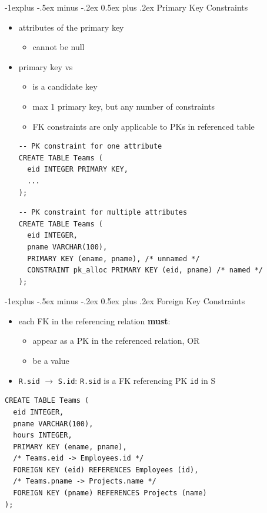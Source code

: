 \documentclass[10pt, landscape]{article}
\makeatletter
\renewcommand{\subsection}{\@startsection{subsection}{2}{0mm}%
  {-1explus -.5ex minus -.2ex}%
  {0.5ex plus .2ex}%
{\normalfont\normalsize\bfseries}}
\makeatother
\begin{document}
\begin{multicols}{3}
  \subsection{Primary Key Constraints}
  \begin{itemize}
    \item {} attributes of the primary key 
      \begin{itemize}
        \item cannot be null
      \end{itemize}
    \item primary key vs 
      \begin{itemize}
        \item {} is a candidate key
        \item max 1 primary key, but any number of  constraints
        \item FK constraints are only applicable to PKs in referenced table
      \end{itemize}
      \begin{lstlisting}[style=mySQL]
-- PK constraint for one attribute
CREATE TABLE Teams (
  eid INTEGER PRIMARY KEY, 
  ... 
);
      \end{lstlisting}
      \begin{lstlisting}[style=mySQL]
-- PK constraint for multiple attributes
CREATE TABLE Teams (
  eid INTEGER,
  pname VARCHAR(100),
  PRIMARY KEY (ename, pname), /* unnamed */
  CONSTRAINT pk_alloc PRIMARY KEY (eid, pname) /* named */
);
      \end{lstlisting}
  \end{itemize}

  \subsection{Foreign Key Constraints}
  \begin{itemize}
    \item each FK in the referencing relation \textbf{must}:
      \begin{itemize}
        \item appear as a PK in the referenced relation, OR
        \item be a  value
      \end{itemize}
    \item \texttt{R.sid} $\rightarrow$ \texttt{S.id}: \texttt{R.sid} is a FK referencing PK \texttt{id} in S
  \end{itemize}
  \begin{lstlisting}[style=mySQL]
CREATE TABLE Teams (
  eid INTEGER,
  pname VARCHAR(100),
  hours INTEGER,
  PRIMARY KEY (ename, pname),
  /* Teams.eid -> Employees.id */
  FOREIGN KEY (eid) REFERENCES Employees (id), 
  /* Teams.pname -> Projects.name */
  FOREIGN KEY (pname) REFERENCES Projects (name)
);
  \end{lstlisting}


\end{multicols}
\end{document}

